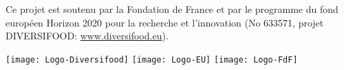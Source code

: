 


Ce projet est soutenu par la Fondation de France et par le programme du fond européen Horizon 2020  pour la recherche et l'innovation (No 633571, projet DIVERSIFOOD: \url{www.diversifood.eu}).

\begin{center}
\texttt{[image: Logo-Diversifood]} \hspace{.5cm}
\texttt{[image: Logo-EU]} \hspace{.5cm}
\texttt{[image: Logo-FdF]}
\end{center}







